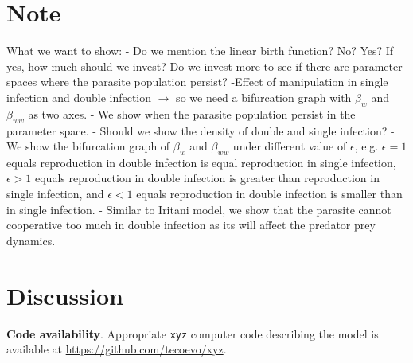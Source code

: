 \documentclass{article}
\begin{document}
\section{Note}

What we want to show:
- Do we mention the linear birth function? No? Yes? If yes, how much should we invest? Do we invest more to see if there are parameter spaces where the parasite population persist?
-Effect of manipulation in single infection and double infection $\rightarrow$ so we need a bifurcation graph with $\beta_w$ and $\beta_{ww}$ as two axes. 
- We show when the parasite population persist in the parameter space. 
- Should we show the density of double and single infection?
- We show the bifurcation graph of $\beta_w$ and $\beta_{ww}$ under different value of $\epsilon$, e.g. $\epsilon = 1$ equals reproduction in double infection is equal reproduction in single infection, $\epsilon > 1$ equals reproduction in double infection is greater than reproduction in single infection, and $\epsilon < 1$ equals reproduction in double infection is smaller than in single infection. 
- Similar to Iritani model, we show that the parasite cannot cooperative too much in double infection as its will affect the predator prey dynamics.

\section{Discussion}

\textbf{Code availability}.
Appropriate {\tt{xyz}} computer code describing the model is available at {\url{https://github.com/tecoevo/xyz}}.







\appendix
\end{document}

